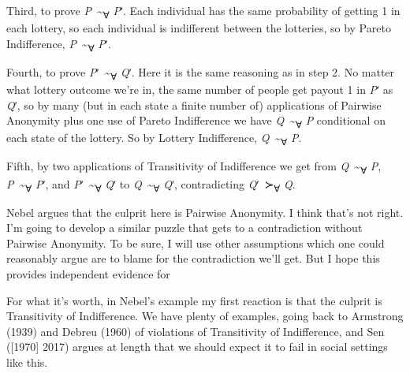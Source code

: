 \documentclass[
  letterpaper,
  DIV=11,
  numbers=noendperiod,
  oneside]{scrartcl}
\begin{document}
Third, to prove \emph{P}~\textasciitilde{}\textsubscript{∀} \emph{P}ʹ.
Each individual has the same probability of getting 1 in each lottery,
so each individual is indifferent between the lotteries, so by Pareto
Indifference, \emph{P}~\textasciitilde{}\textsubscript{∀} \emph{P}ʹ.

Fourth, to prove \emph{P}ʹ~\textasciitilde{}\textsubscript{∀} \emph{Q}ʹ.
Here it is the same reasoning as in step 2. No matter what lottery
outcome we're in, the same number of people get payout 1 in \emph{P}ʹ as
\emph{Q}ʹ, so by many (but in each state a finite number of)
applications of Pairwise Anonymity plus one use of Pareto Indifference
we have \emph{Q}~\textasciitilde{}\textsubscript{∀} \emph{P} conditional
on each state of the lottery. So by Lottery Indifference,
\emph{Q}~\textasciitilde{}\textsubscript{∀} \emph{P}.

Fifth, by two applications of Transitivity of Indifference we get from
\emph{Q}~\textasciitilde{}\textsubscript{∀} \emph{P},
\emph{P}~\textasciitilde{}\textsubscript{∀} \emph{P}ʹ, and
\emph{P}ʹ~\textasciitilde{}\textsubscript{∀} \emph{Q}ʹ to
\emph{Q}~\textasciitilde{}\textsubscript{∀} \emph{Q}ʹ, contradicting
\emph{Q}ʹ~≻\textsubscript{∀} \emph{Q}.

Nebel argues that the culprit here is Pairwise Anonymity. I think that's
not right. I'm going to develop a similar puzzle that gets to a
contradiction without Pairwise Anonymity. To be sure, I will use other
assumptions which one could reasonably argue are to blame for the
contradiction we'll get. But I hope this provides independent evidence
for

For what it's worth, in Nebel's example my first reaction is that the
culprit is Transitivity of Indifference. We have plenty of examples,
going back to Armstrong (1939) and Debreu (1960) of violations of
Transitivity of Indifference, and Sen ({[}1970{]} 2017) argues at length
that we should expect it to fail in social settings like this.
\end{document}
